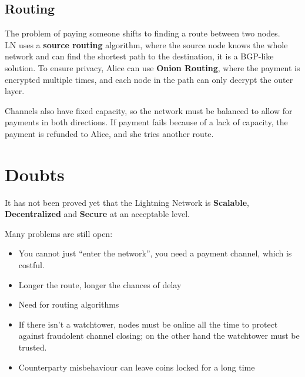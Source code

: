\subsection{Routing}
The problem of paying someone shifts to finding a route between two nodes.\\
LN uses a \textbf{source routing} algorithm, where the source node knows the whole network and can find the shortest path to the destination, it is a BGP-like solution.
To ensure privacy, Alice can use \textbf{Onion Routing}, where the payment is encrypted multiple times, and each node in the path can only decrypt the outer layer.

Channels also have fixed capacity, so the network must be balanced to allow for payments in both directions. 
If payment fails because of a lack of capacity, the payment is refunded to Alice, and she tries another route.

\section{Doubts}
It has not been proved yet that the Lightning Network is \textbf{Scalable}, \textbf{Decentralized} and \textbf{Secure} at an acceptable level.

Many problems are still open:
\begin{itemize}
   \item You cannot just ``enter the network'', you need a payment channel, which is costful.
   \item Longer the route, longer the chances of delay
   \item Need for routing algorithms
   \item If there isn't a watchtower, nodes must be online all the time to protect against fraudolent channel closing; on the other hand the watchtower must be trusted.
   \item Counterparty misbehaviour can leave coins locked for a long time
\end{itemize}